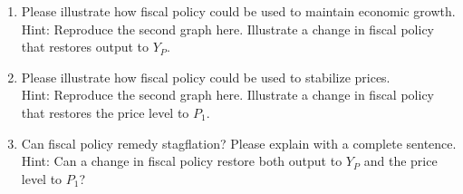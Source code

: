 \documentclass[
    letterpaper,paper=portrait,fleqn,
    DIV=16,fontsize=12pt,twoside=semi,
    parskip=full-,
    headings=standardclasses]
{scrartcl}
\begin{document}
\clearpage

\begin{enumerate}
\item Please illustrate how fiscal policy could be used to maintain economic growth. \\ {\footnotesize Hint: Reproduce the second graph here. Illustrate a change in fiscal policy that restores output to $Y_P$.}

\vfill

\item Please illustrate how fiscal policy could be used to stabilize prices. \\ {\footnotesize Hint: Reproduce the second graph here. Illustrate a change in fiscal policy that restores the price level to $P_1$.}

\vfill

\item Can fiscal policy remedy stagflation? Please explain with a complete sentence.  \\ {\footnotesize Hint: Can a change in fiscal policy restore both output to $Y_P$ and the price level to $P_1$?}

\vspace{2\baselineskip}

\end{enumerate}
\end{document}
